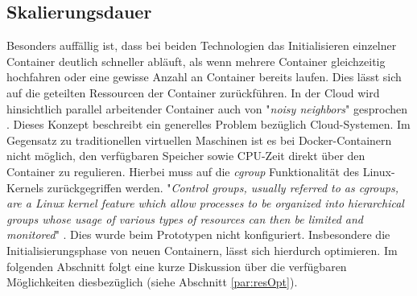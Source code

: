 \subsection{Skalierungsdauer}
\label{ss:skalierungsdauer}
Besonders auffällig ist, dass bei beiden Technologien das Initialisieren einzelner Container deutlich schneller abläuft, als wenn mehrere Container gleichzeitig hochfahren oder eine gewisse Anzahl an Container bereits laufen. Dies lässt sich auf die geteilten Ressourcen der Container zurückführen. In der Cloud wird hinsichtlich parallel arbeitender Container auch von "\emph{noisy neighbors}" gesprochen \cite[Seite~67 ff.]{oreilly-docker}. Dieses Konzept beschreibt ein generelles Problem bezüglich Cloud-Systemen. Im Gegensatz zu traditionellen virtuellen Maschinen ist es bei Docker-Containern nicht möglich, den verfügbaren Speicher sowie CPU-Zeit direkt über den Container zu regulieren. Hierbei muss auf die \emph{cgroup} Funktionalität des Linux-Kernels zurückgegriffen werden. "\emph{Control groups, usually referred to as cgroups, are a Linux kernel feature which allow processes to be organized into hierarchical groups whose usage of various types of resources can then be limited and monitored}" \cite{man-cgroups}. Dies wurde beim Prototypen nicht konfiguriert. Insbesondere die Initialisierungsphase von neuen Containern, lässt sich hierdurch optimieren. Im folgenden Abschnitt folgt eine kurze Diskussion über die verfügbaren Möglichkeiten diesbezüglich (siehe Abschnitt \ref{par:resOpt}).

